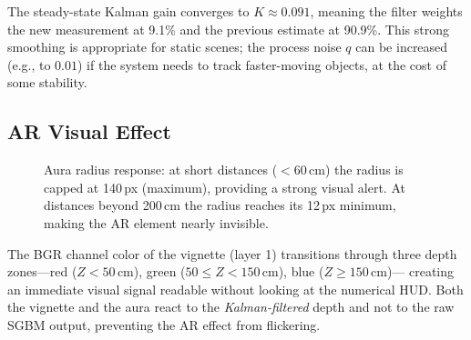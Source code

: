 \documentclass[12pt, a4paper]{article}
\begin{document}
The steady-state Kalman gain converges to $K \approx 0.091$, meaning the filter
weights the new measurement at 9.1\% and the previous estimate at 90.9\%. This
strong smoothing is appropriate for static scenes; the process noise $q$ can be
increased (e.g., to $0.01$) if the system needs to track faster-moving objects,
at the cost of some stability.

\subsection{AR Visual Effect}

\begin{figure}[htbp]
\centering
{}
\caption{Aura radius response: at short distances ($<60$\,cm) the radius is capped
at 140\,px (maximum), providing a strong visual alert. At distances beyond 200\,cm
the radius reaches its 12\,px minimum, making the AR element nearly invisible.}
\label{fig:ar_curve}
\end{figure}

The BGR channel color of the vignette (layer 1) transitions through three depth
zones---red ($Z < 50$\,cm), green ($50 \leq Z < 150$\,cm), blue ($Z \geq 150$\,cm)---
creating an immediate visual signal readable without looking at the numerical HUD.
Both the vignette and the aura react to the \emph{Kalman-filtered} depth and not to
the raw SGBM output, preventing the AR effect from flickering.
\end{document}
